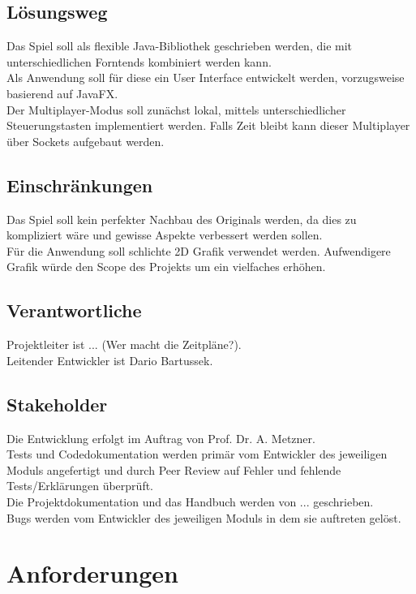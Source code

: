 \documentclass[12pt]{article}
\begin{document}
\subsection{Lösungsweg}
Das Spiel soll als flexible Java-Bibliothek geschrieben werden, die mit unterschiedlichen Forntends kombiniert werden kann. \\
Als Anwendung soll für diese ein User Interface entwickelt werden, vorzugsweise basierend auf JavaFX. \\
Der Multiplayer-Modus soll zunächst lokal, mittels unterschiedlicher Steuerungstasten implementiert werden.
Falls Zeit bleibt kann dieser Multiplayer über Sockets aufgebaut werden.

\subsection{Einschränkungen}
Das Spiel soll kein perfekter Nachbau des Originals werden, da dies zu kompliziert wäre und gewisse Aspekte verbessert werden sollen. \\
Für die Anwendung soll schlichte 2D Grafik verwendet werden. Aufwendigere Grafik würde den Scope des Projekts um ein vielfaches erhöhen.

\subsection{Verantwortliche}
Projektleiter ist ... (Wer macht die Zeitpläne?). \\
Leitender Entwickler ist Dario Bartussek. \\


\subsection{Stakeholder}
Die Entwicklung erfolgt im Auftrag von Prof. Dr. A. Metzner. \\
Tests und Codedokumentation werden primär vom Entwickler des jeweiligen Moduls angefertigt und durch Peer Review auf Fehler und fehlende Tests/Erklärungen überprüft. \\
Die Projektdokumentation und das Handbuch werden von ... geschrieben. \\
Bugs werden vom Entwickler des jeweiligen Moduls in dem sie auftreten gelöst. \\

\newpage

\section{Anforderungen}
\end{document}

